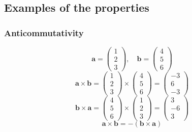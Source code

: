 \documentclass[a4paper,12pt]{article}
\begin{document}
\begin{itemize}[leftmargin=*]
\subsection*{Examples of the properties}

\subsubsection*{Anticommutativity}
\[
\mathbf{a} = \begin{pmatrix} 1 \\ 2 \\ 3 \end{pmatrix}, \quad \mathbf{b} = \begin{pmatrix} 4 \\ 5 \\ 6 \end{pmatrix}
\]
\[
\mathbf{a} \times \mathbf{b} = \begin{pmatrix} 1 \\ 2 \\ 3 \end{pmatrix} \times \begin{pmatrix} 4 \\ 5 \\ 6 \end{pmatrix} = \begin{pmatrix} -3 \\ 6 \\ -3 \end{pmatrix}
\]
\[
\mathbf{b} \times \mathbf{a} = \begin{pmatrix} 4 \\ 5 \\ 6 \end{pmatrix} \times \begin{pmatrix} 1 \\ 2 \\ 3 \end{pmatrix} = \begin{pmatrix} 3 \\ -6 \\ 3 \end{pmatrix}
\]
\[
\mathbf{a} \times \mathbf{b} = - (\mathbf{b} \times \mathbf{a})
\]


\end{itemize}
\end{document}

